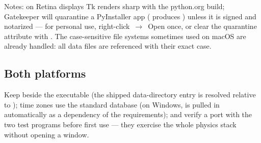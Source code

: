 Notes: on Retina displays Tk renders sharp with the python.org build;
Gatekeeper will quarantine a PyInstaller app ( produces
) unless it is signed and notarized --- for personal use,
right-click~$\to$~Open once, or clear the quarantine attribute with
. The case-sensitive file
systems sometimes used on macOS are already handled: all data files are
referenced with their exact case.

\subsection{Both platforms}

Keep  beside the executable (the shipped data-directory entry
is resolved relative to ); time zones use the standard
 database (on Windows,  is pulled
in automatically as a dependency of the requirements); and verify a port
with the two test programs before first use --- they exercise the whole
physics stack without opening a window.
